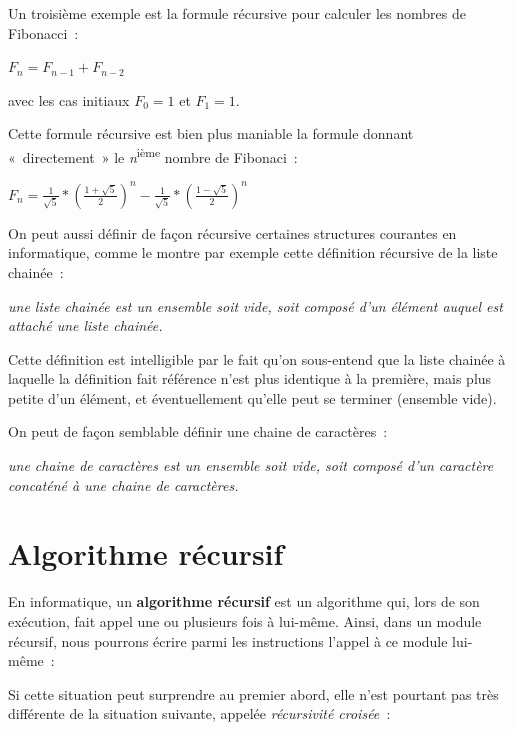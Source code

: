 	Un troisième exemple est la formule récursive pour 
	calculer les nombres de Fibonacci~:
	
	{\centering
	$F_n=F_{n-1}+F_{n-2}$
	\par}
	
	avec les cas initiaux $F_0 = 1$ et $F_1 = 1$. 
	
	Cette formule récursive est bien plus maniable la formule 
	donnant «~directement~» le \textit{n}\textsuperscript{ième} 
	nombre de Fibonaci~:
	
	{\centering
	$F_n=\frac{1}{\sqrt{5}} * (\frac{1+\sqrt{5}}{2})^n - \frac{1}{\sqrt{5}} * (\frac{1-\sqrt{5}}{2})^n $
	\par}

	On peut aussi définir de façon récursive certaines structures 
	courantes en informatique, comme le montre par
	exemple cette définition récursive de la liste chainée~:

	\textit{
	une liste chainée est un ensemble soit vide, 
	soit composé d'un élément auquel est attaché une liste chainée.}

	Cette définition est intelligible par le fait qu'on sous-entend 
	que la liste chainée à laquelle la définition fait
	référence n'est plus identique à la première, mais plus 
	petite d'un élément, et éventuellement qu'elle peut se terminer
	(ensemble vide).

	On peut de façon semblable définir une chaine de caractères~:

	\textit{une chaine de caractères est un ensemble soit vide, 
	soit composé d'un caractère concaténé à une chaine de caractères.}
	

\section{Algorithme récursif}

	En informatique, un \textbf{algorithme récursif} est 
	un algorithme qui, lors de son exécution, fait appel une ou
	plusieurs fois à lui-même. Ainsi, dans un module récursif, 
	nous pourrons écrire parmi les instructions l'appel à ce
	module lui-même~:


	Si cette situation peut surprendre au premier abord, elle 
	n'est pourtant pas très différente de la situation suivante,
	appelée \textit{récursivité croisée~}:

